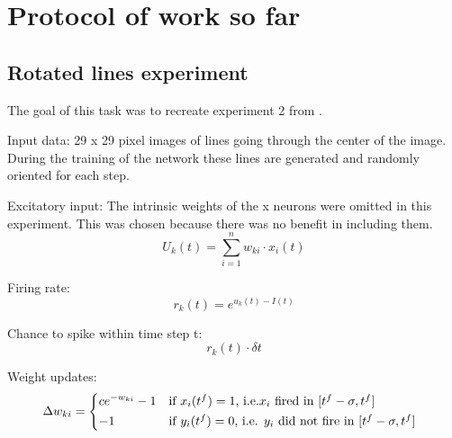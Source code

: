 \chapter{Protocol of work so far}

\section{Rotated lines experiment}

The goal of this task was to recreate experiment 2 from \citet{nessler}.

Input data:
29 x 29 pixel images of lines going through the center of the image. During the training of the network these lines are generated and randomly oriented for each step.



Excitatory input:
The intrinsic weights of the x neurons were omitted in this experiment. This was chosen because there was no benefit in including them.
\begin{equation}
\label{eqn:uk}
U_k(t) = \sum_{i=1}^n w_{ki} \cdot x_i(t)
\end{equation}

Firing rate:
\begin{equation}
\label{eqn:rk}
r_k(t) = e^{u_k(t) - I(t)}
\end{equation}

Chance to spike within time step \delta t:
\begin{equation}
\label{eqn:rkdt}
r_k(t) \cdot \delta t
\end{equation}

Weight updates:
\begin{equation}
\label{deltawki}
\Delta w_{ki} = \begin{dcases*} ce^{-w_{ki}} - 1 & if $x_{i}(t^f) = 1$, i.e.$x_{i}$ fired in $ [t^f - \sigma, t^f] $ \\
-1 & \text{if $ y_i(t^f) = 0 $, i.e. $ y_i $ did not fire in $ [t^f - \sigma, t^f] $ } \end{dcases*}
\end{equation}
